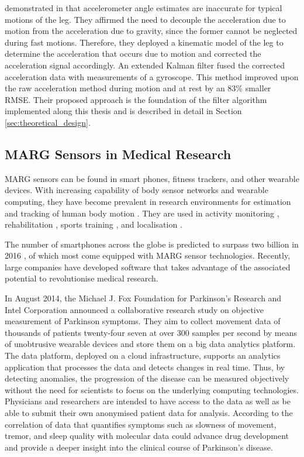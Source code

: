 \citeauthor{bennett_motion_2014} demonstrated in \cite{bennett_motion_2014} that accelerometer angle estimates are inaccurate for typical motions of the leg. They affirmed the need to decouple the acceleration due to motion from the acceleration due to gravity, since the former cannot be neglected during fast motions. Therefore, they deployed a kinematic model of the leg to determine the acceleration that occurs due to motion and corrected the acceleration signal accordingly. An extended Kalman filter fused the corrected acceleration data with measurements of a gyroscope. This method improved upon the raw acceleration method during motion and at rest by an 83\% smaller \gls{RMSE}. Their proposed approach is the foundation of the filter algorithm implemented along this thesis and is described in detail in Section \ref{sec:theoretical_design}.

\subsection{MARG Sensors in Medical Research}\label{sec:MARG_sensors_medical}

MARG sensors can be found in smart phones, fitness trackers, and other wearable devices. With increasing capability of body sensor networks and wearable computing, they have become prevalent in research environments for estimation and tracking of human body motion \cite{bennett_motion_2014}. They are used in activity monitoring \cite{veltink_detection_96}\cite{najafi_ambulatory_03}\cite{ermes_sports_08}, rehabilitation \cite{giggins_rehabilitation_13}\cite{lupinski_ligament_11}, sports training \cite{bonnet_squat_13}\cite{ermes_sports_08}, and localisation \cite{hoflinger_localization_13}\cite{Bennett_distance_13}. 

The number of smartphones across the globe is predicted to surpass two billion in 2016 \cite{emarketer_smartphones}, of which most come equipped with MARG sensor technologies. Recently, large companies have developed software that takes advantage of the associated potential to revolutionise medical research.

In August 2014, the Michael J. Fox Foundation for Parkinson’s Research and Intel Corporation \cite{Intel_2013} announced a collaborative research study on objective measurement of Parkinson symptoms. They aim to collect movement data of thousands of patients twenty-four seven at over 300 samples per second by means of unobtrusive wearable devices and store them on a big data analytics platform. The data platform, deployed on a cloud infrastructure, supports an analytics application that processes the data and detects changes in real time. Thus, by detecting anomalies, the progression of the disease can be measured objectively without the need for scientists to focus on the underlying computing technologies. Physicians and researchers are intended to have access to the data as well as be able to submit their own anonymised patient data for analysis. According to \cite{Intel_2013} the correlation of data that quantifies symptoms such as slowness of movement, tremor, and sleep quality with molecular data could advance drug development and provide a deeper insight into the clinical course of Parkinson's disease.

